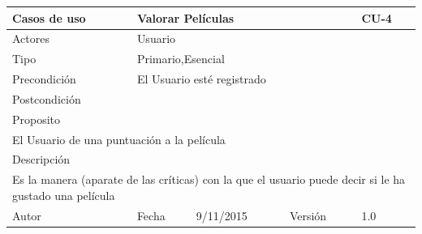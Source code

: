 \documentclass{article}
\begin{document}
\begin{table}[h]
\begin{tabular}{|l|l|l|l|l|l|}
\hline
\multicolumn{2}{|p{2cm}|}{Casos de uso}  & \multicolumn{3}{p{7cm}|}{Valorar Películas} & CU-4 \\
\hline
\multicolumn{2}{|p{2cm}|}{Actores}       & \multicolumn{4}{p{8cm}|}{Usuario}        \\
\hline
\multicolumn{2}{|p{2cm}|}{Tipo}          & \multicolumn{4}{p{8cm}|}{Primario,Esencial}        \\
\hline
\multicolumn{2}{|p{2cm}|}{Precondición}  & \multicolumn{4}{p{8cm}|}{El Usuario esté registrado}        \\
\hline
\multicolumn{2}{|p{2cm}|}{Postcondición} & \multicolumn{4}{p{8cm}|}{}        \\
\hline
\multicolumn{6}{|p{10cm}|}{Proposito}                                   \\
\hline
\multicolumn{6}{|p{10cm}|}{El Usuario de una puntuación a la película}                                            \\
\hline
\multicolumn{6}{|p{10cm}|}{Descripción}                                 \\
\hline
\multicolumn{6}{|p{10cm}|}{Es la manera (aparate de las críticas) con la que el usuario puede decir si le ha gustado una película }                                            \\
\hline
Autor              &              & Fecha    & 9/11/2015    &   Versión  &1.0\\
\hline
\end{tabular}
\end{table}
\end{document}

